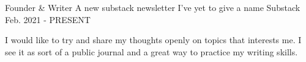

\begin{cventries}

  \cventry
    {Founder \& Writer} %
    {A new substack newsletter I've yet to give a name} %
    {Substack} %
    {Feb. 2021 - PRESENT} %
    {
      \begin{cvitems} %
        \item {I would like to try and share my thoughts openly on topics that interests me. I see it as sort of a public journal and a great way to practice my writing skills.}
      \end{cvitems}
    }


\end{cventries}
